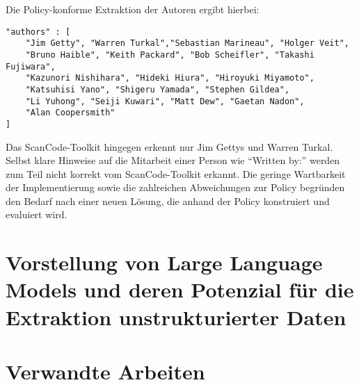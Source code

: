 Die Policy-konforme Extraktion der Autoren ergibt hierbei:

\begin{lstlisting}[numbers=none, keepspaces=true]
"authors" : [
    "Jim Getty", "Warren Turkal","Sebastian Marineau", "Holger Veit",
    "Bruno Haible", "Keith Packard", "Bob Scheifler", "Takashi Fujiwara",
    "Kazunori Nishihara", "Hideki Hiura", "Hiroyuki Miyamoto",
    "Katsuhisi Yano", "Shigeru Yamada", "Stephen Gildea",
    "Li Yuhong", "Seiji Kuwari", "Matt Dew", "Gaetan Nadon",
    "Alan Coopersmith"
]
\end{lstlisting}

Das ScanCode-Toolkit hingegen erkennt nur Jim Gettys und Warren Turkal.
Selbst klare Hinweise auf die Mitarbeit einer Person wie \enquote{Written by:} werden zum Teil nicht korrekt vom ScanCode-Toolkit erkannt.
Die geringe Wartbarkeit der Implementierung sowie die zahlreichen Abweichungen zur Policy begründen den Bedarf nach einer neuen Lösung, die anhand der Policy konstruiert und evaluiert wird.

\section{Vorstellung von Large Language Models und deren Potenzial für die Extraktion unstrukturierter Daten}\label{sec:vorstellung-llm}


\section{Verwandte Arbeiten}\label{sec:verwandte-arbeiten}
